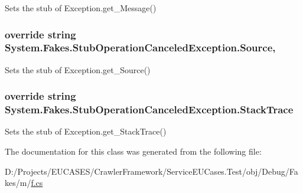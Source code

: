 Sets the stub of Exception.\-get\-\_\-\-Message()

\hypertarget{class_system_1_1_fakes_1_1_stub_operation_canceled_exception_a6ad7e55f09cbe9cfa9ce7c7fe87ad090}{
\subsubsection[{Source}]{\setlength{\rightskip}{0pt plus 5cm}override string System.\-Fakes.\-Stub\-Operation\-Canceled\-Exception.\-Source\hspace{0.3cm}{\ttfamily [get]}, {\ttfamily [set]}}}\label{class_system_1_1_fakes_1_1_stub_operation_canceled_exception_a6ad7e55f09cbe9cfa9ce7c7fe87ad090}


Sets the stub of Exception.\-get\-\_\-\-Source()

\hypertarget{class_system_1_1_fakes_1_1_stub_operation_canceled_exception_a4c30f9cf5688d6aac7079dc59e4e19e5}{
\subsubsection[{Stack\-Trace}]{\setlength{\rightskip}{0pt plus 5cm}override string System.\-Fakes.\-Stub\-Operation\-Canceled\-Exception.\-Stack\-Trace\hspace{0.3cm}{\ttfamily [get]}}}\label{class_system_1_1_fakes_1_1_stub_operation_canceled_exception_a4c30f9cf5688d6aac7079dc59e4e19e5}


Sets the stub of Exception.\-get\-\_\-\-Stack\-Trace()



The documentation for this class was generated from the following file\-:\begin{DoxyCompactItemize}
\item 
D\-:/\-Projects/\-E\-U\-C\-A\-S\-E\-S/\-Crawler\-Framework/\-Service\-E\-U\-Cases.\-Test/obj/\-Debug/\-Fakes/m/\hyperlink{m_2f_8cs}{f.\-cs}\end{DoxyCompactItemize}
